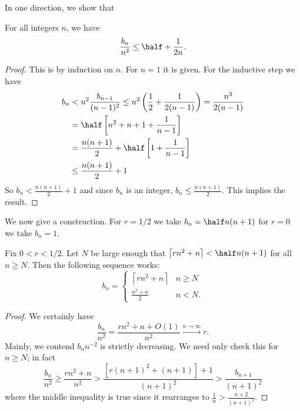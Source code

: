 \documentclass[11pt]{scrartcl}
\begin{document}
In one direction, we show that
\begin{claim*}
  For all integers $n$, we have
  \[ \frac{b_n}{n^2} \le \half + \frac{1}{2n}. \]
\end{claim*}
\begin{proof}
  This is by induction on $n$. For $n=1$ it is given.
  For the inductive step we have
  \begin{align*}
    b_n &< n^2 \frac{b_{n-1}}{(n-1)^2}
    \le n^2 \left( \frac12 + \frac{1}{2(n-1)}  \right)
    = \frac{n^3}{2(n-1)} \\
    &= \half \left[ n^2+n+1 + \frac{1}{n-1} \right] \\
    &= \frac{n(n+1)}{2} + \half \left[ 1 + \frac{1}{n-1} \right] \\
    &\le \frac{n(n+1)}{2} + 1
  \end{align*}
  So $b_n < \frac{n(n+1)}{2} + 1$
  and since $b_n$ is an integer, $b_n \le \frac{n(n+1)}{2}$.
  This implies the result.
\end{proof}

We now give a construction.
For $r=1/2$ we take $b_n = \half n(n+1)$
for $r=0$ we take $b_n = 1$.

\begin{claim*}
Fix $0 < r < 1/2$.
Let $N$ be large enough that
$\left\lceil rn^2+n \right\rceil < \half n(n+1)$ for all $n \ge N$.
Then the following sequence works:
\[ b_n = \begin{cases}
    \left\lceil rn^2 + n \right\rceil & n \ge N \\
    \frac{n^2+n}{2} & n < N.
  \end{cases} \]
\end{claim*}
\begin{proof}
  We certainly have
  \[ \frac{b_n}{n^2}
    = \frac{rn^2 + n + O(1)}{n^2}
    \xrightarrow{n \to \infty} r.
  \]
  Mainly, we contend $b_n n^{-2}$ is strictly decreasing.
  We need only check this for $n \ge N$; in fact
  \[ \frac{b_n}{n^2} \ge \frac{rn^2+n}{n^2}
    > \frac{[r(n+1)^2+(n+1)]+1}{(n+1)^2}
    > \frac{b_{n+1}}{(n+1)^2} \]
  where the middle inequality is true
  since it rearranges to $\frac1n > \frac{n+2}{(n+1)^2}$.
\end{proof}

\pagebreak
\end{document}
